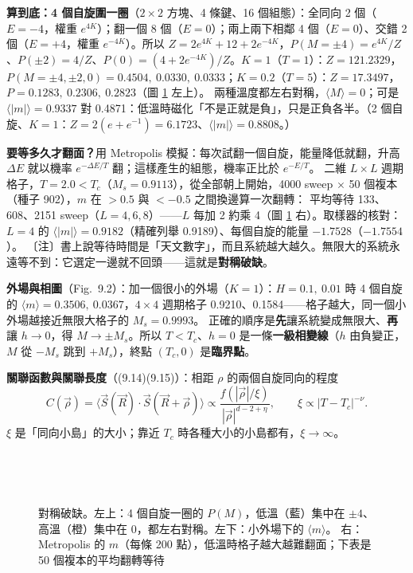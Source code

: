 \textbf{算到底：4 個自旋圍一圈}（$2\times2$ 方塊、4 條鍵、16 個組態）：全同向 2 個（$E=-4$，權重 $e^{4K}$）；翻一個 8 個（$E=0$）；兩上兩下相鄰 4 個（$E=0$）、交錯 2 個（$E=+4$，權重 $e^{-4K}$）。所以
$Z=2e^{4K}+12+2e^{-4K}$，$P(M=\pm4)=e^{4K}/Z$、$P(\pm2)=4/Z$、$P(0)=(4+2e^{-4K})/Z$。$K=1$（$T=1$）：$Z=121.2329$，$P(M=\pm4,\pm2,0)=0.4504,\ 0.0330,\ 0.0333$；$K=0.2$（$T=5$）：$Z=17.3497$，$P=0.1283,\ 0.2306,\ 0.2823$（圖 \ref{nine-fig-break} 左上）。
兩種溫度都左右對稱，$\langle M\rangle=0$；可是 $\langle|m|\rangle=0.9337$ 對 0.4871：低溫時磁化「不是正就是負」，只是正負各半。（2 個自旋、$K=1$：$Z=2(e+e^{-1})=6.1723$、$\langle|m|\rangle=0.8808$。）

\textbf{要等多久才翻面？}用 Metropolis 模擬：每次試翻一個自旋，能量降低就翻，升高 $\Delta E$ 就以機率 $e^{-\Delta E/T}$ 翻；這樣產生的組態，機率正比於 $e^{-E/T}$。
二維 $L\times L$ 週期格子，$T=2.0<T_c$（$M_s=0.9113$），從全部朝上開始，4000 sweep $\times$ 50 個複本（種子 902），$m$ 在 $>0.5$ 與 $<-0.5$ 之間換邊算一次翻轉：
平均等待 133、608、2151 sweep（$L=4,6,8$）——$L$ 每加 2 約乘 4（圖 \ref{nine-fig-break} 右）。取樣器的核對：$L=4$ 的 $\langle|m|\rangle=0.9182$（精確列舉 0.9189）、每個自旋的能量 $-1.7528$（$-1.7554$）。
〔注〕書上說等待時間是「天文數字」，而且系統越大越久。無限大的系統永遠等不到：它選定一邊就不回頭——這就是\textbf{對稱破缺}。

\textbf{外場與相圖}（Fig.~9.2）：加一個很小的外場（$K=1$）：$H=0.1,\ 0.01$ 時 4 個自旋的 $\langle m\rangle=0.3506,\ 0.0367$，$4\times4$ 週期格子 0.9210、0.1584——格子越大，同一個小外場越接近無限大格子的 $M_s=0.9993$。
正確的順序是\textbf{先}讓系統變成無限大、\textbf{再}讓 $h\to0$，得 $M\to\pm M_s$。所以 $T<T_c$、$h=0$ 是一條\textbf{一級相變線}（$h$ 由負變正，$M$ 從 $-M_s$ 跳到 $+M_s$），終點 $(T_c,0)$ 是\textbf{臨界點}。

\textbf{關聯函數與關聯長度}（(9.14)(9.15)）：相距 $\rho$ 的兩個自旋同向的程度
\[C(\vec\rho)=\langle\vec S(\vec R)\cdot\vec S(\vec R+\vec\rho)\rangle\propto\frac{f(|\vec\rho|/\xi)}{|\vec\rho|^{d-2+\eta}},\qquad\xi\propto|T-T_c|^{-\nu}.\tag{9.14, 9.15}\]
$\xi$ 是「同向小島」的大小；靠近 $T_c$ 時各種大小的小島都有，$\xi\to\infty$。

\begin{figure}[htbp]
\centering
\begin{minipage}[c]{0.44\linewidth}\centering\NineFigPM\\[8pt]\footnotesize\setlength{\tabcolsep}{3pt}\NineTabField\end{minipage}\hfill
\begin{minipage}[c]{0.54\linewidth}\centering\NineFigTrace\\[6pt]\footnotesize\setlength{\tabcolsep}{4pt}\NineTabFlip\end{minipage}
\caption{對稱破缺。左上：4 個自旋一圈的 $P(M)$，低溫（藍）集中在 $\pm4$、高溫（橙）集中在 0，都左右對稱。左下：小外場下的 $\langle m\rangle$。
右：Metropolis 的 $m$（每條 200 點），低溫時格子越大越難翻面；下表是 50 個複本的平均翻轉等待}\label{nine-fig-break}
\end{figure}

